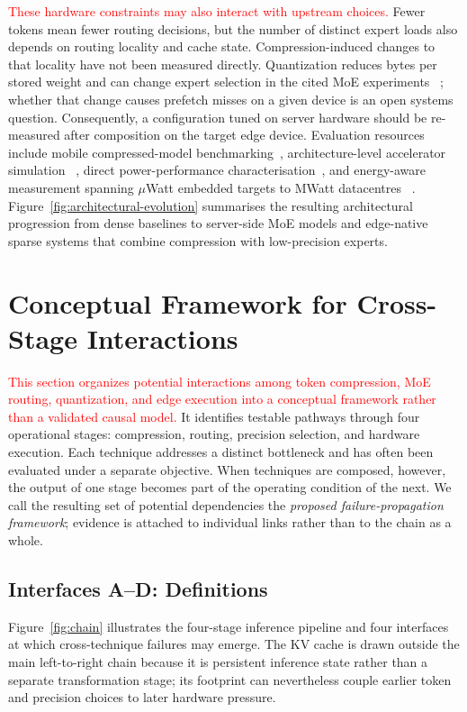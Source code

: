 \documentclass[10pt]{article}
\newenvironment{reviewchange}{\begingroup\color{red}}{\endgroup}
\begin{document}
\textcolor{red}{These hardware constraints may also interact with upstream choices.}  Fewer
tokens mean fewer routing decisions, but the number of distinct expert loads also
depends on routing locality and cache state.  Compression-induced changes to that
locality have not been measured directly.  Quantization reduces bytes per stored
weight and can change expert selection in the cited MoE experiments
~\citep{fu2026eaquantenhancingposttrainingquantization}; whether that change causes
prefetch misses on a given device is an open systems question.  Consequently, a
configuration tuned on server hardware should be re-measured after composition on the
target edge device.  Evaluation resources include mobile compressed-model
benchmarking~\citep{li2025palmbenchcomprehensivebenchmarkcompressed}, architecture-level accelerator simulation
~\citep{sukthanker2024hwgptbenchhardwareawarearchitecturebenchmark}, direct power-performance characterisation~\citep{John_2024}, and
energy-aware measurement spanning $\mu$Watt embedded targets to MWatt datacentres
~\citep{tschand2025mlperfpowerbenchmarkingenergy}.  Figure~\ref{fig:architectural-evolution} summarises the
resulting architectural progression from dense baselines to server-side MoE models and
edge-native sparse systems that combine compression with low-precision experts.



\section{Conceptual Framework for Cross-Stage Interactions}
\label{sec:codesign}
\textcolor{red}{This section organizes potential interactions among token compression,
MoE routing, quantization, and edge execution into a conceptual framework rather than
a validated causal model.}  It identifies testable pathways through four operational
stages: compression, routing, precision selection, and hardware execution.  Each technique addresses a distinct
bottleneck and has often been evaluated under a separate objective.  When techniques
are composed, however, the output of one stage becomes part of the operating condition
of the next.  We call the resulting set of potential dependencies the \emph{proposed
failure-propagation framework}; evidence is attached to individual links rather than
to the chain as a whole.


\begin{reviewchange}
\subsection{Interfaces A--D: Definitions}
\label{sec:chain}

Figure~\ref{fig:chain} illustrates the four-stage inference pipeline and four
interfaces at which cross-technique failures may emerge.  The KV cache is drawn outside
the main left-to-right chain because it is persistent inference state rather than a
separate transformation stage; its footprint can nevertheless couple earlier token
and precision choices to later hardware pressure.
\end{reviewchange}
\end{document}
